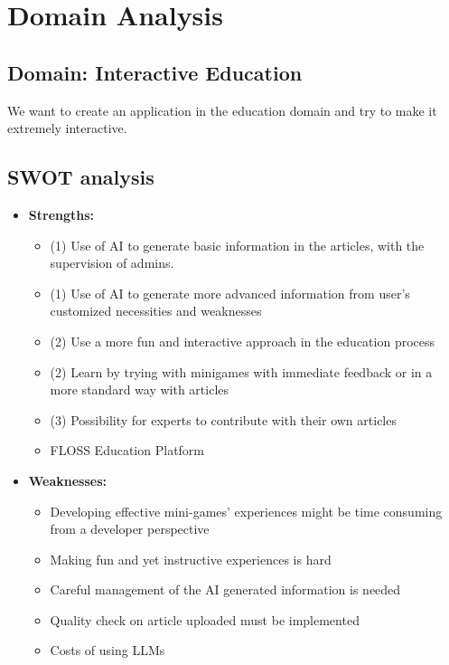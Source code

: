 \section{Domain Analysis} \label{domain-analysis}

\subsection{Domain: Interactive Education}
We want to create an application in the education domain and try to make it extremely interactive.

\subsection{SWOT analysis}

\begin{itemize}
	\item \textbf{Strengths:}
		\begin{itemize}
			\item (1) Use of AI to generate basic information in the articles, with the supervision of admins. 
			\item (1) Use of AI to generate more advanced information from user’s customized necessities and weaknesses
			\item (2) Use a more fun and interactive approach in the education process
			\item (2) Learn by trying with minigames with immediate feedback or in a more standard way with articles
			\item (3) Possibility for experts to contribute with their own articles
			\item FLOSS Education Platform
		\end{itemize}
		
	\item \textbf{Weaknesses:}
		\begin{itemize}
			\item Developing effective mini-games’ experiences might be time consuming from a developer perspective
			\item Making fun and yet instructive experiences is hard
			\item Careful management of the AI generated information is needed
			\item Quality check on article uploaded must be implemented
			\item Costs of using LLMs
		\end{itemize}
		

\end{itemize}
